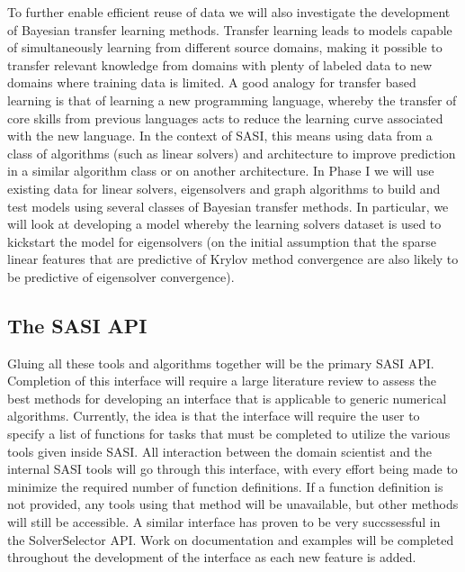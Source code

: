 To further enable efficient reuse of data we will also investigate the development of Bayesian transfer learning methods. Transfer learning leads to models capable of simultaneously learning from different source domains, making it possible to transfer relevant knowledge from domains with plenty of labeled data to new domains where training data is limited. A good analogy for transfer based learning is that of learning a new programming language, whereby the transfer of core skills from previous languages acts to reduce the learning curve associated with the new language. In the context of SASI, this means using data from a class of algorithms (such as linear solvers) and architecture to improve prediction in a similar algorithm class or on another architecture. In Phase I we will use existing data for linear solvers, eigensolvers and graph algorithms to build and test models using several classes of Bayesian transfer methods. In particular, we will look at developing a model whereby the learning solvers dataset is used to kickstart the model for eigensolvers (on the initial assumption that the sparse linear features that are predictive of Krylov method convergence are also likely to be predictive of eigensolver convergence).


\subsection{The SASI API} 
Gluing all these tools and algorithms together will be the primary SASI API. Completion of this interface will require a large literature review to assess the best methods for developing an interface that is applicable to generic numerical algorithms. Currently, the idea is that the interface will require the user to specify a list of functions for tasks that must be completed to utilize the various tools given inside SASI. All interaction between the domain scientist and the internal SASI tools will go through this interface, with every effort being made to minimize the required number of function definitions. If a function definition is not provided, any tools using that method will be unavailable, but other methods will still be accessible. A similar interface has proven to be very succssessful in the SolverSelector API. Work on documentation and examples will be completed throughout the development of the interface as each new feature is added. 
 
